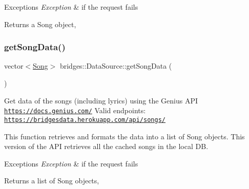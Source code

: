 \begin{DoxyExceptions}{Exceptions}
{\em Exception} & if the request fails\\
\hline
\end{DoxyExceptions}
\begin{DoxyReturn}{Returns}
a Song object, 
\end{DoxyReturn}
\mbox{\label{classbridges_1_1_data_source_a5e8d035a1becf96c71569e0966e93849}} 
\subsubsection{\texorpdfstring{get\+Song\+Data()}{getSongData()}}
{\footnotesize\ttfamily vector$<$\mbox{\hyperlink{classbridges_1_1dataset_1_1_song}{Song}}$>$ bridges\+::\+Data\+Source\+::get\+Song\+Data (\begin{DoxyParamCaption}{ }\end{DoxyParamCaption})\hspace{0.3cm}{\ttfamily [inline]}}

Get data of the songs (including lyrics) using the Genius A\+PI \href{https://docs.genius.com/}{\tt https\+://docs.\+genius.\+com/} Valid endpoints\+: \href{https://bridgesdata.herokuapp.com/api/songs/}{\tt https\+://bridgesdata.\+herokuapp.\+com/api/songs/}

This function retrieves and formats the data into a list of Song objects. This version of the A\+PI retrieves all the cached songs in the local DB.


\begin{DoxyExceptions}{Exceptions}
{\em Exception} & if the request fails\\
\hline
\end{DoxyExceptions}
\begin{DoxyReturn}{Returns}
a list of Song objects, 
\end{DoxyReturn}
\mbox{\label{classbridges_1_1_data_source_a25b33736b4ae9ffea5fe4ebf5dbb3a63}} 
